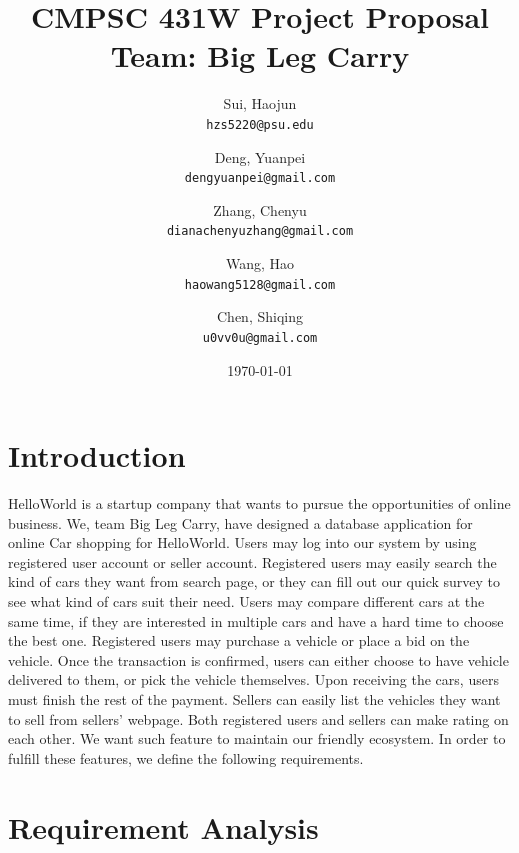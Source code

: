 \documentclass[12pt]{article}
\title{CMPSC 431W Project Proposal\\Team: Big Leg Carry}
\author{
	Sui, Haojun\\
	\texttt{hzs5220@psu.edu}
	\and
	Deng, Yuanpei\\
	\texttt{dengyuanpei@gmail.com}
	\and
	Zhang, Chenyu\\
	\texttt{dianachenyuzhang@gmail.com}
	\and
	Wang, Hao\\
	\texttt{haowang5128@gmail.com}
	\and
	Chen, Shiqing\\
	\texttt{u0vv0u@gmail.com}
}
\date{\today}
\begin{document}
\maketitle
\thispagestyle{empty}
\newpage
\tableofcontents
{}
\setcounter{page}{1}
\newpage
\listoffigures
\newpage
\listoftables
\newpage


\section{Introduction}
HelloWorld is a startup company that wants to pursue the opportunities of online business. We, team Big Leg Carry, have designed a database application for online Car shopping for HelloWorld. Users may log into our system by using registered user account or seller account. Registered users may easily search the kind of cars they want from search page, or they can fill out our quick survey to see what kind of cars suit their need. Users may compare different cars at the same time, if they are interested in multiple cars and have a hard time to choose the best one. Registered users may purchase a vehicle or place a bid on the vehicle. Once the transaction is confirmed, users can either choose to have vehicle delivered to them, or pick the vehicle themselves. Upon receiving the cars, users must finish the rest of the payment. Sellers can easily list the vehicles they want to sell from sellers' webpage. Both registered users and sellers can make rating on each other. We want such feature to maintain our friendly ecosystem. In order to fulfill these features, we define the following requirements.

\newpage

\section{Requirement Analysis}
\end{document}
